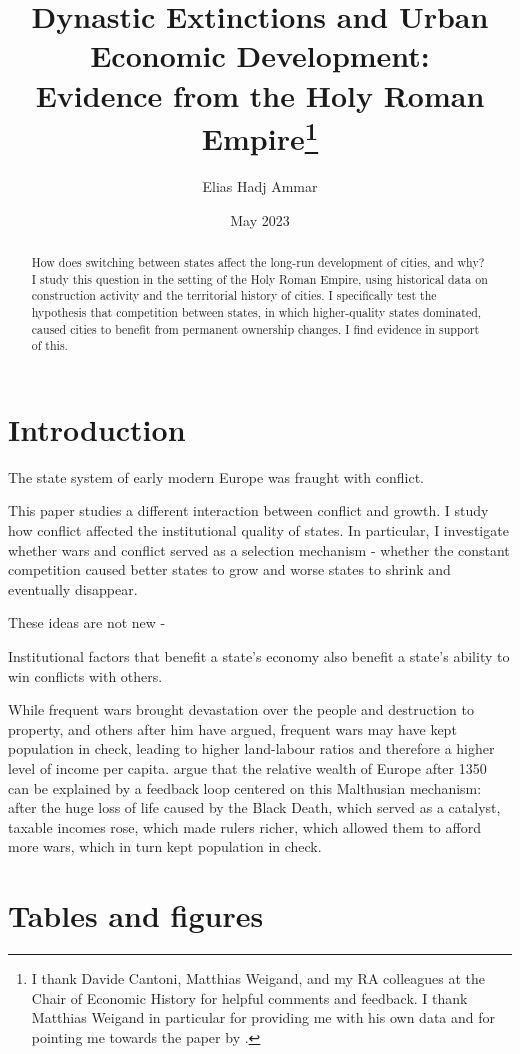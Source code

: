\documentclass{article}
\title{Dynastic Extinctions and Urban Economic Development: \\Evidence from the Holy Roman Empire\footnote{
I thank Davide Cantoni, Matthias Weigand, and my RA colleagues at the Chair of Economic History for helpful comments and feedback. I thank Matthias Weigand in particular for providing me with his own data and for pointing me towards the paper by \cite{schoenholzer2022}.
}
}
\author{Elias Hadj Ammar}
\date{May 2023}
\begin{document}
\onehalfspacing
\maketitle
\thispagestyle{empty}

\begin{abstract}
How does switching between states affect the long-run development of cities, and why? I study this question in the setting of the Holy Roman Empire, using historical data on construction activity and the territorial history of cities. I specifically test the hypothesis that competition between states, in which higher-quality states dominated, caused cities to benefit from permanent ownership changes. I find evidence in support of this.
\end{abstract}

\newpage

\setcounter{page}{1}
\doublespacing



\section{Introduction}

The state system of early modern Europe was fraught with conflict. 

This paper studies a different interaction between conflict and growth. I study how conflict affected the institutional quality of states. In particular, I investigate whether wars and conflict served as a selection mechanism - whether the constant competition caused better states to grow and worse states to shrink and eventually disappear. 


These ideas are not new - 

Institutional factors that benefit a state's economy also benefit a state's ability to win conflicts with others.


While frequent wars brought devastation over the people and destruction to property, \cite{malthus1798} and others after him have argued, frequent wars may have kept population in check, leading to higher land-labour ratios and therefore a higher level of income per capita. \cite{voigtlnder2013} argue that the relative wealth of Europe after 1350 can be explained by a feedback loop centered on this Malthusian mechanism: after the huge loss of life caused by the Black Death, which served as a catalyst, taxable incomes rose, which made rulers richer, which allowed them to afford more wars, which in turn kept population in check.









\newpage
\onehalfspacing



\newpage
\section*{Tables and figures}
\end{document}
